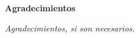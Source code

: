 \newpage
\begin{center}
{\bf \Huge Agradecimientos}
\end{center}
\vspace{1cm}
\setlength{\baselineskip}{0.8cm}

\begin{flushright}
\textit{Agradecimientos, si son necesarios.
}
\end{flushright}

